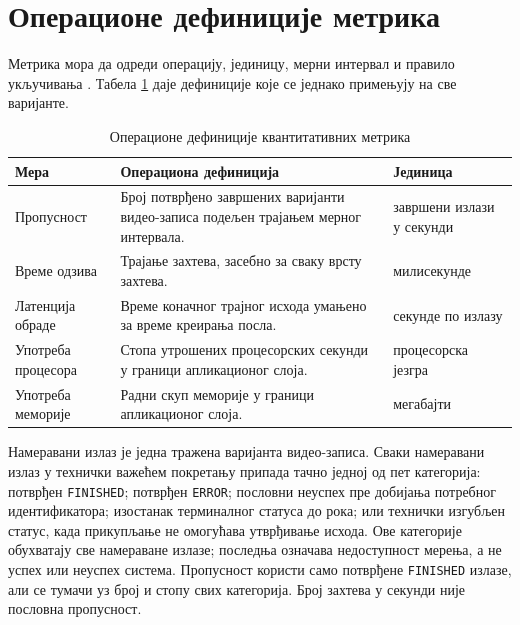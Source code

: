 \documentclass[12pt,oneside]{memoir}
\begin{document}
\section{Операционе дефиниције метрика}

Метрика мора да одреди операцију, јединицу, мерни интервал и правило
укључивања \cite{jain1991art,kounev2020benchmarking}. Табела
\ref{tab:metodologija-metrike} даје дефиниције које се једнако примењују на
све варијанте.

\begin{table}[!ht]
	\centering
	\small
	\begin{tabular}{|p{}|p{}|p{}|}
		\hline
		\textbf{Мера}      & \textbf{Операциона дефиниција}                                                     & \textbf{Јединица}         \\
		\hline
		Пропусност         & Број потврђено завршених варијанти видео-записа подељен трајањем мерног интервала. & завршени излази у секунди \\
		\hline
		Време одзива       & Трајање захтева, засебно за сваку врсту захтева.                                   & милисекунде               \\
		\hline
		Латенција обраде   & Време коначног трајног исхода умањено за време креирања посла.                     & секунде по излазу         \\
		\hline
		Употреба процесора & Стопа утрошених процесорских секунди у граници апликационог слоја.                 & процесорска језгра        \\
		\hline
		Употреба меморије  & Радни скуп меморије у граници апликационог слоја.                                  & мегабајти                 \\
		\hline
	\end{tabular}
	\caption{Операционе дефиниције квантитативних метрика}
	\label{tab:metodologija-metrike}
\end{table}

Намеравани излаз је једна тражена варијанта видео-записа. Сваки намеравани
излаз у технички важећем покретању припада тачно једној од пет категорија:
потврђен \texttt{FINISHED}; потврђен \texttt{ERROR}; пословни неуспех пре
добијања потребног идентификатора; изостанак терминалног статуса до рока; или
технички изгубљен статус, када прикупљање не омогућава утврђивање исхода. Ове
категорије обухватају све намераване излазе; последња означава недоступност
мерења, а не успех или неуспех система. Пропусност користи само потврђене
\texttt{FINISHED} излазе, али се тумачи уз број и стопу свих категорија. Број
захтева у секунди није пословна пропусност.
\end{document}
